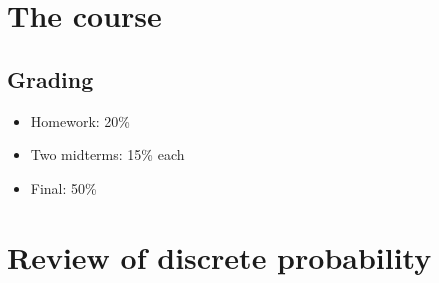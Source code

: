 \chapter*{The course} \label{chp:course}

\section*{Grading} \label{sec:grading}
\begin{itemize}
    \item Homework: 20\%
    \item Two midterms: 15\% each
    \item Final: 50\%
\end{itemize}

\chapter{Review of discrete probability} \label{chp:review}

